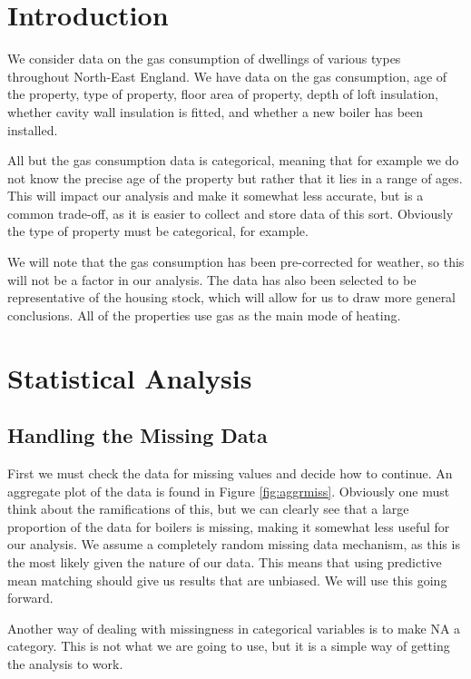 \documentclass[11pt]{article}
\begin{document}
\section{Introduction}

We consider data on the gas consumption of dwellings of various types throughout North-East England. We have data on the gas consumption, age of the property, type of property, floor area of property, depth of loft insulation, whether cavity wall insulation is fitted, and whether a new boiler has been installed.

All but the gas consumption data is categorical, meaning that for example we do not know the precise age of the property but rather that it lies in a range of ages. This will impact our analysis and make it somewhat less accurate, but is a common trade-off, as it is easier to collect and store data of this sort. Obviously the type of property must be categorical, for example. 

We will note that the gas consumption has been pre-corrected for weather, so this will not be a factor in our analysis. The data has also been selected to be representative of the housing stock, which will allow for us to draw more general conclusions. All of the properties use gas as the main mode of heating.

\section{Statistical Analysis}

\subsection{Handling the Missing Data}

First we must check the data for missing values and decide how to continue. An aggregate plot of the data is found in Figure \ref{fig:aggrmiss}. Obviously one must think about the ramifications of this, but we can clearly see that a large proportion of the data for boilers is missing, making it somewhat less useful for our analysis. We assume a completely random missing data mechanism, as this is the most likely given the nature of our data. This means that using predictive mean matching should give us results that are unbiased. We will use this going forward.

Another way of dealing with missingness in categorical variables is to make NA a category. This is not what we are going to use, but it is a simple way of getting the analysis to work.
\end{document}
